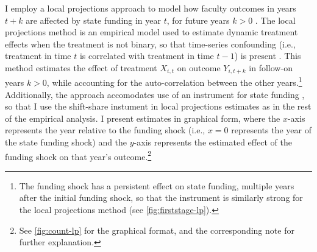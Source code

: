 I employ a local projections approach to model how faculty outcomes in years $t+k$ are affected by state funding in year $t$, for future years $k > 0$ \citep{jorda2005}.
The local projections method is an empirical model used to estimate dynamic treatment effects when the treatment is not binary, so that time-series confounding (i.e., treatment in time $t$ is correlated with treatment in time $t-1$) is present \citep{montiel2021local}.
This method estimates the effect of treatment $X_{i,t}$ on outcome $Y_{i, t+ k}$ in follow-on years $k > 0$, while accounting for the auto-correlation between the other years.\footnote{
    The funding shock has a persistent effect on state funding, multiple years after the initial funding shock, so that the instrument is similarly strong for the local projections method (see \autoref{fig:firststage-lp}).
}
Additionally, the approach accomodates use of an instrument for state funding \citep{olea2021inference}, so that I use the shift-share instument in local projections estimates as in the rest of the empirical analysis.
I present estimates in graphical form, where the $x$-axis represents the year relative to the funding shock (i.e., $x = 0$ represents the year of the state funding shock) and the $y$-axis represents the estimated effect of the funding shock on that year's outcome.\footnote{
    See \autoref{fig:count-lp} for the graphical format, and the corresponding note for further explanation.
}
